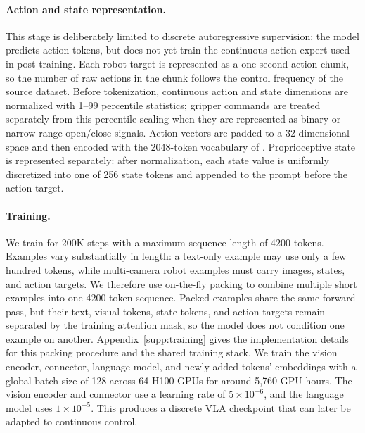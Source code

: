 \paragraph{Action and state representation.}
This stage is deliberately limited to discrete autoregressive supervision: the model predicts action tokens, but does not yet train the continuous action expert used in post-training. Each robot target is represented as a one-second action chunk, so the number of raw actions in the chunk follows the control frequency of the source dataset. Before tokenization, continuous action and state dimensions are normalized with 1--99 percentile statistics; gripper commands are treated separately from this percentile scaling when they are represented as binary or narrow-range open/close signals. Action vectors are padded to a 32-dimensional space and then encoded with the 2048-token vocabulary of \molmoactfast. Proprioceptive state is represented separately: after normalization, each state value is uniformly discretized into one of 256 state tokens and appended to the prompt before the action target.

\paragraph{Training.}
We train for 200K steps with a maximum sequence length of 4200 tokens. Examples vary substantially in length: a text-only example may use only a few hundred tokens, while multi-camera robot examples must carry images, states, and action targets. We therefore use on-the-fly packing to combine multiple short examples into one 4200-token sequence. Packed examples share the same forward pass, but their text, visual tokens, state tokens, and action targets remain separated by the training attention mask, so the model does not condition one example on another. Appendix~\ref{supp:training} gives the implementation details for this packing procedure and the shared training stack. We train the vision encoder, connector, language model, and newly added tokens' embeddings with a global batch size of 128 across 64 H100 GPUs for around 5,760 GPU hours. The vision encoder and connector use a learning rate of \(5\times10^{-6}\), and the language model uses \(1\times10^{-5}\). This produces a discrete VLA checkpoint that can later be adapted to continuous control.

